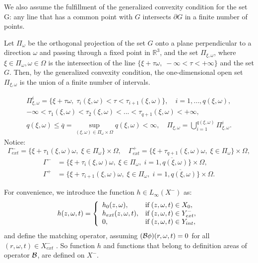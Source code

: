 \documentclass[12pt,reqno]{report}
\begin{document}
We also assume the fulfillment of the generalized convexity condition \cite{2,6} for the set {G}: any line that has a common point with $G$ intersects $\partial G$ in a finite number of points.

Let $\Pi_{\omega}$ be the orthogonal projection of the set $G$ onto a plane perpendicular to a direction $\omega $ and passing through a fixed point in $\mathbb{R}^3$, and the set $\Pi_{\xi,\omega} $, where $\xi \in \Pi_{\omega}, \omega \in \Omega $ is the intersection of the line $ \{\xi + \tau \omega, \; - \infty < \tau <+\infty \} $ and the set $G$. Then, by the generalized convexity condition, the one-dimensional open set $ \Pi_{\xi, \omega} $ is the union of a finite number of intervals.

\begin{equation}
\begin{array}{c}
\Pi^i_{\xi,\omega}=\{\xi + \tau \omega, \; \tau_i (\xi,\omega) < \tau
<
\tau_{i+1} (\xi,\omega) \}, \quad i=1,...,q(\xi,\omega), \\
- \infty < \tau_1(\xi,\omega) < \tau_2 (\xi,\omega) < ... <\tau_{q+1}
(\xi,\omega) < + \infty, \\
q(\xi,\omega) \leq \overline{q}= \sup \limits_{(\xi,\omega)\in
	\Pi_{\omega} \times \Omega} q(\xi,\omega) < \infty,\quad
\Pi_{\xi,\omega}= \bigcup \limits^{q(\xi,\omega)}_{i=1}
\Pi^i_{\xi,\omega}.
\end{array}
\end{equation}
Notice:
$$
\Gamma^{-}_{ext}= \{\xi + \tau_1(\xi,\omega) \omega, \; \xi \in
\Pi_{\omega} \} \times \Omega, \quad \Gamma^{+}_{ext}= \{\xi +
\tau_{q+1}(\xi,\omega) \omega, \; \xi \in \Pi_{\omega} \} \times
\Omega,
$$
$$
\begin{array}{rl}
\Gamma^{-}&= \{\xi + \tau_i(\xi,\omega) \omega, \; \xi \in
\Pi_{\omega},\; i=\overline{1,q(\xi,\omega)} \} \times \Omega,
\\
\Gamma^{+}&= \{\xi + \tau_{i+1}(\xi,\omega) \omega, \; \xi \in
\Pi_{\omega}, \;i=\overline{1,q(\xi,\omega)} \} \times \Omega.
\end{array}
$$

For convenience, we introduce the function $h \in L_{\infty}( X^{-})$ 
as:
$$
h(z,\omega,t)=\left\{%
\begin{array}{ll}
h_0(z,\omega), & \hbox{if} \; (z,\omega,t) \in X_0, \\
h_{ext}(z,\omega,t), & \hbox{if} \; (z,\omega,t) \in Y^-_{ext}, \\
0,                   & \hbox{if} \; (z,\omega,t) \in Y_{int}, \\
\end{array}%
\right.
$$
and define the matching operator, assuming $({\cal B} \phi) (r,\omega,t)=0$ for all $(r,\omega,t) \in X^-_{ext}$ .
So function $h$ and functions that belong to definition areas of operator ${\cal B}$, are defined on $X^{-}$.
\end{document}
